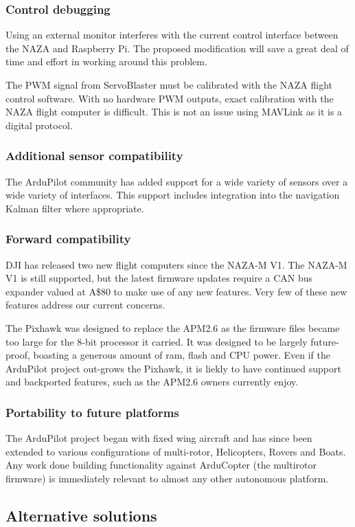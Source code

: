 \documentclass[a4paper, 11pt, titlepage]{article}
\begin{document}
\subsubsection{Control debugging}
Using an external monitor interferes with the current control interface between the NAZA and Raspberry Pi. The proposed modification will save a great deal of time and effort in working around this problem.

The PWM signal from ServoBlaster must be calibrated with the  NAZA flight control software. With no hardware PWM outputs, exact calibration with the NAZA flight computer is difficult. This is not an issue using MAVLink as it is a digital protocol. 

\subsubsection{Additional sensor compatibility}
The ArduPilot community has added support for a wide variety of sensors over a wide variety of interfaces. This support includes integration into the navigation Kalman filter where appropriate.
\subsubsection{Forward compatibility}
DJI has released two new flight computers since the NAZA-M V1.
The NAZA-M V1 is still supported, but the latest firmware updates require a CAN bus expander valued at A\$80 to make use of any new features.  Very few of these new features address our current concerns.

The Pixhawk was designed to replace the APM2.6 as the firmware files became too large for the 8-bit processor it carried.  It was designed to be largely future-proof, boasting a generous amount of ram, flash and CPU power.  Even if the ArduPilot project out-grows the Pixhawk, it is liekly to have continued support and backported features, such as the APM2.6 owners currently enjoy.
\subsubsection{Portability to future platforms}
The ArduPilot project began with fixed wing aircraft and has since been extended to various configurations of multi-rotor, Helicopters, Rovers and Boats.
Any work done building functionality against ArduCopter (the multirotor firmware) is immediately relevant to almost any other autonomous platform.

\subsection{Alternative solutions}
\end{document}
